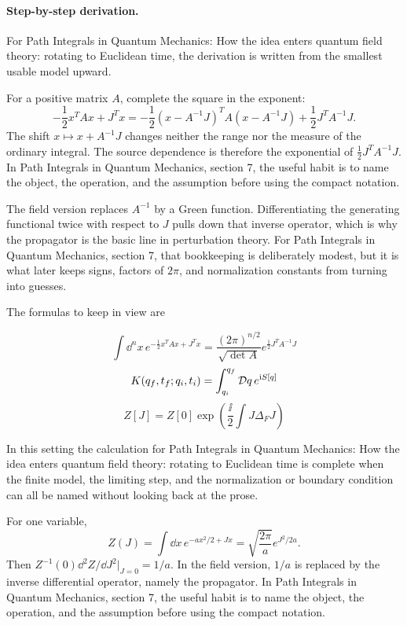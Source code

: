 \paragraph{Step-by-step derivation.}

For Path Integrals in Quantum Mechanics: How the idea enters quantum field theory: rotating to Euclidean time, the derivation is written from the smallest usable model upward.

For a positive matrix \(A\), complete the square in the exponent:
\[
  -\frac12x^TAx+J^Tx
  =
  -\frac12(x-A^{-1}J)^TA(x-A^{-1}J)
  +\frac12J^TA^{-1}J.
\]
The shift \(x\mapsto x+A^{-1}J\) changes neither the range nor the measure of the ordinary integral.  The source dependence is therefore the exponential of \(\frac12J^TA^{-1}J\).  In Path Integrals in Quantum Mechanics, section 7, the useful habit is to name the object, the operation, and the assumption before using the compact notation.

The field version replaces \(A^{-1}\) by a Green function.  Differentiating the generating functional twice with respect to \(J\) pulls down that inverse operator, which is why the propagator is the basic line in perturbation theory.  For Path Integrals in Quantum Mechanics, section 7, that bookkeeping is deliberately modest, but it is what later keeps signs, factors of \(2\pi\), and normalization constants from turning into guesses.

The formulas to keep in view are

\[
  \int\dd^n x\,e^{-\frac12x^TAx+J^Tx}=\frac{(2\pi)^{n/2}}{\sqrt{\det A}}e^{\frac12J^TA^{-1}J}
\]
\[
  K(q_f,t_f;q_i,t_i)=\int_{q_i}^{q_f}\mathcal D q\,e^{\mathrm i S[q]}
\]
\[
  Z[J]=Z[0]\exp\left(\frac{\ii}{2}\int J\Delta_FJ\right)
\]

In this setting the calculation for Path Integrals in Quantum Mechanics: How the idea enters quantum field theory: rotating to Euclidean time is complete when the finite model, the limiting step, and the normalization or boundary condition can all be named without looking back at the prose.




\begin{example}
For one variable,
\[
  Z(J)=\int\dd x\,e^{-ax^2/2+Jx}
  =\sqrt{\frac{2\pi}{a}}e^{J^2/2a}.
\]
Then \(Z^{-1}(0)\dd^2Z/\dd J^2|_{J=0}=1/a\).  In the field version, \(1/a\) is replaced by the inverse differential operator, namely the propagator.  In Path Integrals in Quantum Mechanics, section 7, the useful habit is to name the object, the operation, and the assumption before using the compact notation.
\end{example}




